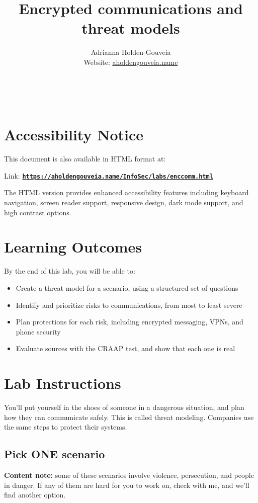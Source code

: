 \documentclass[12pt]{article}
\title{Encrypted communications and threat models}
\author{
        Adrianna Holden-Gouveia \\
        Website: \href{https://aholdengouveia.name}{aholdengouveia.name}\\ 
        \date{\vspace{-5ex}}
        \faGithub {: aholdengouveia} \\
        \faTwitter {: aholdengouveia} \\
        }
\begin{document}
    

\maketitle

\section*{Accessibility Notice}
This document is also available in HTML format at:

Link: \href{https://aholdengouveia.name/InfoSec/labs/enccomm.html}{\textbf{\nolinkurl{https://aholdengouveia.name/InfoSec/labs/enccomm.html}}}

The HTML version provides enhanced accessibility features including keyboard navigation, screen reader support, responsive design, dark mode support, and high contrast options.



 

\section*{Learning Outcomes}
By the end of this lab, you will be able to:
\begin{itemize}
    \item Create a threat model for a scenario, using a structured set of questions
    \item Identify and prioritize risks to communications, from most to least severe
    \item Plan protections for each risk, including encrypted messaging, VPNs, and phone security
    \item Evaluate sources with the CRAAP test, and show that each one is real
\end{itemize}

\section*{Lab Instructions}
You'll put yourself in the shoes of someone in a dangerous situation, and plan how they can communicate safely. This is called threat modeling. Companies use the same steps to protect their systems.

\subsection*{Pick ONE scenario}
\textbf{Content note:} some of these scenarios involve violence, persecution, and people in danger. If any of them are hard for you to work on, check with me, and we'll find another option.
\end{document}
